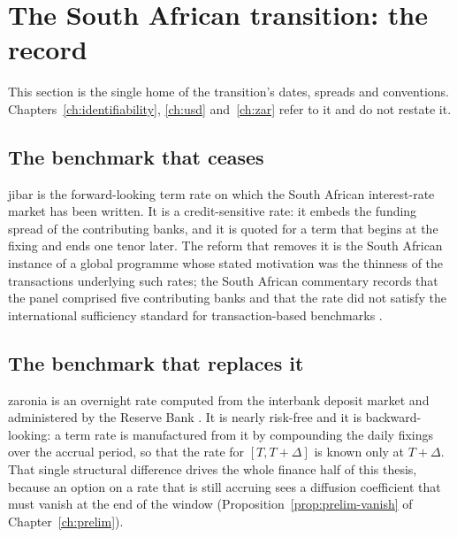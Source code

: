 \documentclass[../../../main.tex]{subfiles}
\begin{document}

\section{The South African transition: the record}\label{sec:intro-record}

This section is the single home of the transition's dates, spreads and conventions. Chapters~\ref{ch:identifiability}, \ref{ch:usd} and~\ref{ch:zar} refer to it and do not restate it.

\subsection{The benchmark that ceases}

\gls{jibar} is the forward-looking term rate on which the South African interest-rate market has been written. It is a credit-sensitive rate: it embeds the funding spread of the contributing banks, and it is quoted for a term that begins at the fixing and ends one tenor later. The reform that removes it is the South African instance of a global programme whose stated motivation was the thinness of the transactions underlying such rates; the South African commentary records that the panel comprised five contributing banks and that the rate did not satisfy the international sufficiency standard for transaction-based benchmarks \citep[pp.~1--2]{alfeus2024}.

\subsection{The benchmark that replaces it}

\gls{zaronia} is an overnight rate computed from the interbank deposit market and administered by the Reserve Bank \citep[p.~2]{alfeus2024}. It is nearly risk-free and it is backward-looking: a term rate is manufactured from it by compounding the daily fixings over the accrual period, so that the rate for $[T,T+\Delta]$ is known only at $T+\Delta$. That single structural difference drives the whole finance half of this thesis, because an option on a rate that is still accruing sees a diffusion coefficient that must vanish at the end of the window (Proposition~\ref{prop:prelim-vanish} of Chapter~\ref{ch:prelim}).
\end{document}
